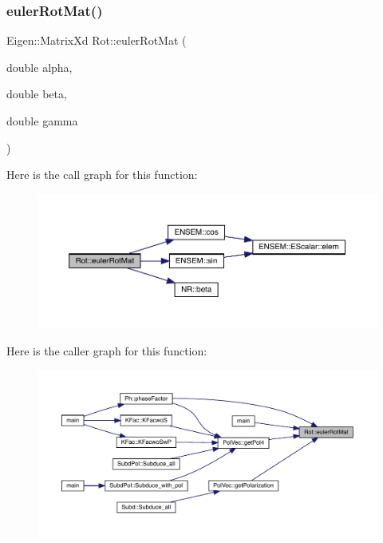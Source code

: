 \subsubsection{\texorpdfstring{eulerRotMat()}{eulerRotMat()}}
{\footnotesize\ttfamily Eigen\+::\+Matrix\+Xd Rot\+::euler\+Rot\+Mat (\begin{DoxyParamCaption}\item[{double}]{alpha,  }\item[{double}]{beta,  }\item[{double}]{gamma }\end{DoxyParamCaption})}

Here is the call graph for this function\+:\nopagebreak
\begin{figure}[H]
\begin{center}
\leavevmode
\includegraphics[width=350pt]{d7/dcc/namespaceRot_adcd0cec8d1616e5f74d30cb3ad1aca99_cgraph}
\end{center}
\end{figure}
Here is the caller graph for this function\+:
\nopagebreak
\begin{figure}[H]
\begin{center}
\leavevmode
\includegraphics[width=350pt]{d7/dcc/namespaceRot_adcd0cec8d1616e5f74d30cb3ad1aca99_icgraph}
\end{center}
\end{figure}
\mbox{\label{namespaceRot_a4026d82f0e6d2b013f7b082ff3d509aa}} 
